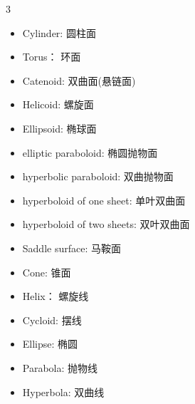 \documentclass[a4paper,12pt]{article}
\begin{document}
\begin{multicols}{3}
    \begin{itemize}[leftmargin=*]
        \item Cylinder: 圆柱面
        \item Torus： 环面
        \item Catenoid: 双曲面(悬链面)
        \item Helicoid: 螺旋面
        \item Ellipsoid: 椭球面
        \item elliptic paraboloid: 椭圆抛物面
        \item hyperbolic paraboloid: 双曲抛物面
        \item hyperboloid of one sheet: 单叶双曲面
        \item hyperboloid of two sheets: 双叶双曲面
        \item Saddle surface: 马鞍面
        \item Cone: 锥面
        \item Helix： 螺旋线
        \item Cycloid: 摆线
        \item Ellipse: 椭圆
        \item Parabola: 抛物线
        \item Hyperbola: 双曲线
    \end{itemize}
\end{multicols}
\end{document}
